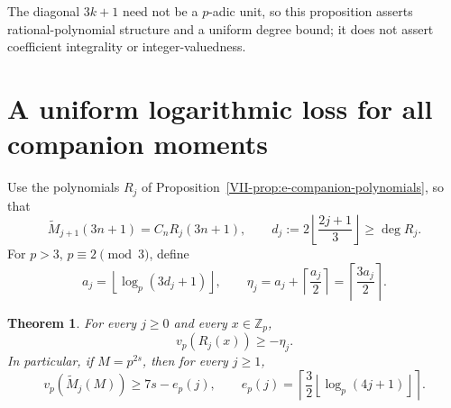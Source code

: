 \documentclass[11pt,letterpaper]{article}
\newtheorem{theorem}{Theorem}[section]
\numberwithin{equation}{section}
\begin{document}
The diagonal $3k+1$ need not be a $p$-adic unit, so this proposition
asserts rational-polynomial structure and a uniform degree bound;
it does not assert coefficient integrality or integer-valuedness.

\section{A uniform logarithmic loss for all companion moments}\label{loc-VII-7}
\label{VII-sec:E7companionlog}
Use the polynomials $R_j$ of Proposition~\ref{VII-prop:e-companion-polynomials},
so that
\[
 \widetilde M_{j+1}(3n+1)=C_nR_j(3n+1),\qquad
 d_j:=2\left\lfloor\frac{2j+1}{3}\right\rfloor\ge\deg R_j.
\]
For $p>3$, $p\equiv2\pmod3$, define
\[
 a_j=\left\lfloor\log_p(3d_j+1)\right\rfloor,
 \qquad \eta_j=a_j+\left\lceil\frac{a_j}{2}\right\rceil
 =\left\lceil\frac{3a_j}{2}\right\rceil.
\]
\begin{theorem}\label{VII-E7:companion-log}
For every $j\ge0$ and every $x\in\mathbb Z_p$,
\[
 v_p(R_j(x))\ge-\eta_j.
\]
In particular, if $M=p^{2s}$, then for every $j\ge1$,
\[
 v_p(\widetilde M_j(M))\ge7s-e_p(j),\qquad
 e_p(j)=\left\lceil\frac32\left\lfloor\log_p(4j+1)\right\rfloor\right\rceil.
\]
\end{theorem}
\end{document}

